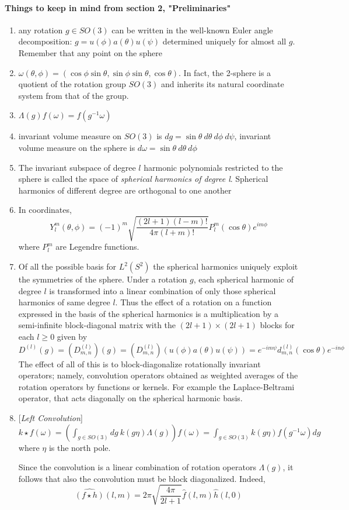 \paragraph{Things to keep in mind from section 2, "Preliminaries"}
\begin{enumerate}
	\item any rotation $g\in SO(3)$ can be written in the well-known Euler angle decomposition: $g = u(\phi)a(\theta)u(\psi)$ determined uniquely for almost all $g$. Remember that any point on the sphere
	\item $\omega(\theta, \phi) = \left(\cos\phi\sin\theta, \sin\phi\sin\theta, \cos\theta\right)$. In fact, the 2-sphere is a quotient of the rotation group $SO(3)$ and inherits its natural coordinate system from that of the group.
	\item $\Lambda(g)f(\omega) = f(g^{-1}\omega)$
	\item invariant volume measure on $SO(3)$ is $dg=\sin\theta\ d\theta\ d\phi\ d\psi$, invariant volume measure on the sphere is $d\omega = \sin\theta\ d\theta\ d\phi$
	\item The invariant subspace of degree $l$ harmonic polynomials restricted to the sphere is called the space of \textit{spherical harmonics of degree l}. Spherical harmonics of different degree are orthogonal to one another
	\item In coordinates, 
	$$Y_l^m(\theta, \phi) =(-1)^m\sqrt{\frac{(2l+1)(l-m)!}{4\pi(l+m)!}}P_l^m(\cos\theta)e^{im\phi}$$
	where $P_l^m$ are Legendre functions.
	\item Of all the possible basis for $L^2(S^2)$ the spherical harmonics uniquely exploit the symmetries of the sphere. Under a rotation $g$, each spherical harmonic of degree $l$ is transformed into a linear combination of only those spherical harmonics of same degree $l$.
	Thus the effect of a rotation on a function expressed in the basis of the spherical harmonics is a multiplication by a semi-infinite block-diagonal matrix with the $(2l+1)\times(2l+1)$ blocks for each $l \geq 0$ given by $$D^{(l)}(g) = \left(D^{(l)}_{m,n}\right) (g) =  \left(D^{(l)}_{m,n}\right)(u(\phi)a(\theta)u(\psi)) = e^{-im\psi}d^{(l)}_{m,n}(\cos \theta) e^{-in\phi}$$
	The effect of all of this is to block-diagonalize rotationally invariant operators; namely, convolution operators obtained as weighted averages of the rotation operators by functions or kernels. For example the Laplace-Beltrami operator, that acts diagonally on the spherical harmonic basis.
	\item \begin{definition}{[\textit{Left Convolution}]}\\
		$k\star f(\omega) = \left(\int_{g\in SO(3)}dg\ k(g\eta)\Lambda(g)\right)f(\omega) = \int_{g\in SO(3)}k(g\eta)f(g^{-1}\omega)dg$
		where $\eta$ is the north pole. 
	\end{definition}
Since the convolution is a linear combination of rotation operators $\Lambda(g)$, it follows that also the convolution must be block diagonalized. Indeed,
$$\hat {(f \star h)}(l,m) = 2\pi \sqrt{\frac{4\pi}{2l+1}}\hat f(l,m) \hat h(l,0) $$


\end{enumerate}
